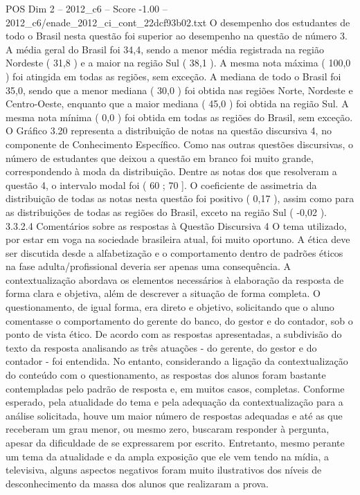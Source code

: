 \begin{textsample}{POS Dim 2 – 2012\_c6 – Score -1.00 – 2012\_c6/enade\_2012\_ci\_cont\_22dcf93b02.txt}
O desempenho dos estudantes de todo o Brasil nesta questão foi superior ao desempenho na questão de número 3.
A média geral do Brasil foi 34,4, sendo a menor média registrada na região Nordeste ( 31,8 ) e a maior na região Sul ( 38,1 ).
A mesma nota máxima ( 100,0 ) foi atingida em todas as regiões, sem exceção.
A mediana de todo o Brasil foi 35,0, sendo que a menor mediana ( 30,0 ) foi obtida nas regiões Norte, Nordeste e Centro-Oeste, enquanto que a maior mediana ( 45,0 ) foi obtida na região Sul.
A mesma nota mínima ( 0,0 ) foi obtida em todas as regiões do Brasil, sem exceção.
O Gráfico 3.20 representa a distribuição de notas na questão discursiva 4, no componente de Conhecimento Específico.
Como nas outras questões discursivas, o número de estudantes que deixou a questão em branco foi muito grande, correspondendo à moda da distribuição.
Dentre as notas dos que resolveram a questão 4, o intervalo modal foi ( 60 ; 70 ].
O coeficiente de assimetria da distribuição de todas as notas nesta questão foi positivo ( 0,17 ), assim como para as distribuições de todas as regiões do Brasil, exceto na região Sul ( -0,02 ). 3.3.2.4 Comentários sobre as respostas à Questão Discursiva 4 O tema utilizado, por estar em voga na sociedade brasileira atual, foi muito oportuno.
A ética deve ser discutida desde a alfabetização e o comportamento dentro de padrões éticos na fase adulta/profissional deveria ser apenas uma consequência.
A contextualização abordava os elementos necessários à elaboração da resposta de forma clara e objetiva, além de descrever a situação de forma completa.
O questionamento, de igual forma, era direto e objetivo, solicitando que o aluno comentasse o comportamento do gerente do banco, do gestor e do contador, sob o ponto de vista ético.
De acordo com as respostas apresentadas, a subdivisão do texto da resposta analisando as três atuações - do gerente, do gestor e do contador - foi entendida.
No entanto, considerando a ligação da contextualização do conteúdo com o questionamento, as respostas dos alunos foram bastante contempladas pelo padrão de resposta e, em muitos casos, completas.
Conforme esperado, pela atualidade do tema e pela adequação da contextualização para a análise solicitada, houve um maior número de respostas adequadas e até as que receberam um grau menor, ou mesmo zero, buscaram responder à pergunta, apesar da dificuldade de se expressarem por escrito.
Entretanto, mesmo perante um tema da atualidade e da ampla exposição que ele vem tendo na mídia, a televisiva, alguns aspectos negativos foram muito ilustrativos dos níveis de desconhecimento da massa dos alunos que realizaram a prova.

\end{textsample}
